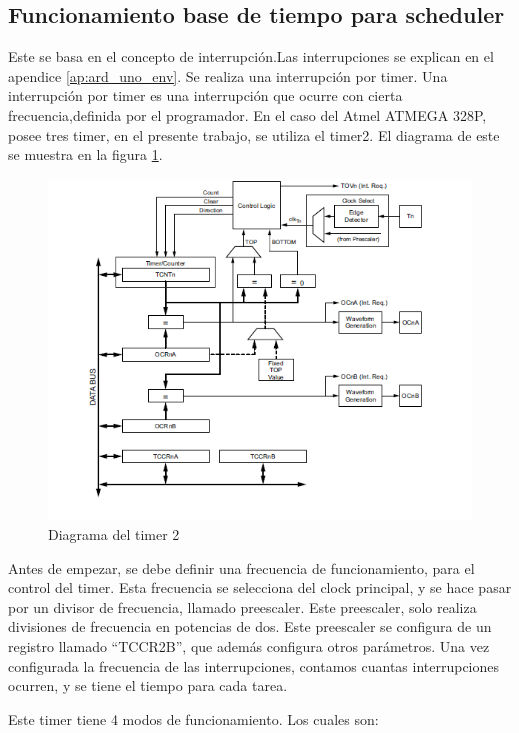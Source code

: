 \subsection{Funcionamiento base de tiempo para scheduler}

Este se basa en el concepto de interrupción.Las interrupciones se explican en el apendice \ref{ap:ard_uno_env}. Se realiza una interrupción por timer. Una interrupción por timer es una interrupción que ocurre con cierta frecuencia,definida por el programador. En el caso del Atmel ATMEGA 328P, posee tres timer, en el presente trabajo, se utiliza el timer2. El diagrama de este se muestra en la figura \ref{fig:timer_2}. 

\begin{figure}[ht]
	\includegraphics{timer_2}
	\caption{Diagrama del timer 2 }
	\label{fig:timer_2}
\end{figure}


Antes de empezar, se debe definir una frecuencia de funcionamiento, para el control del timer. Esta frecuencia se selecciona del clock principal, y se hace pasar por un divisor de frecuencia, llamado preescaler. Este preescaler, solo realiza divisiones de frecuencia en potencias de dos. Este preescaler se configura de un registro llamado “TCCR2B”, que además configura otros parámetros. Una vez configurada la frecuencia de las interrupciones, contamos cuantas interrupciones ocurren, y se tiene el tiempo para cada tarea. 

Este timer tiene 4 modos de funcionamiento. Los cuales son:  

